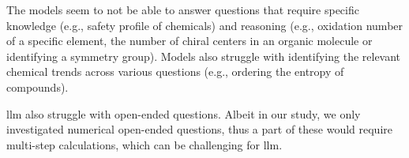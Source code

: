 The models seem to not be able to answer questions that require specific knowledge (e.g., safety profile of chemicals) and reasoning (e.g., oxidation number of a specific element, the number of chiral centers in an organic molecule or identifying a symmetry group).
Models also struggle with identifying the relevant chemical trends across various questions (e.g., ordering the entropy of compounds).

\gls{llm} also struggle with open-ended questions. Albeit in our study, we only investigated numerical open-ended questions, thus a part of these would require multi-step calculations, which can be challenging for \gls{llm}.